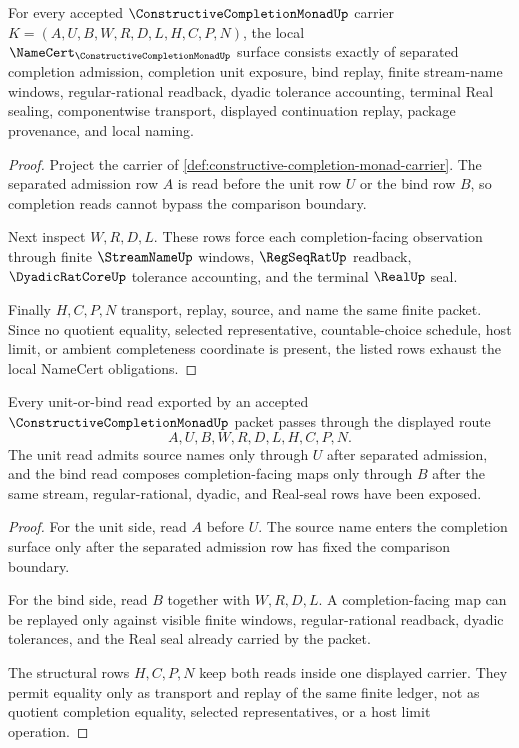 \begin{theorem}
\label{thm:constructive-completion-monad-namecert-obligations}
For every accepted $\ConstructiveCompletionMonadUp$ carrier $K=(A,U,B,W,R,D,L,H,C,P,N)$, the local $\NameCert_{\ConstructiveCompletionMonadUp}$ surface consists exactly of separated completion admission, completion unit exposure, bind replay, finite stream-name windows, regular-rational readback, dyadic tolerance accounting, terminal Real sealing, componentwise transport, displayed continuation replay, package provenance, and local naming.
\end{theorem}
\begin{proof}
Project the carrier of \autoref{def:constructive-completion-monad-carrier}. The separated admission row $A$ is read before the unit row $U$ or the bind row $B$, so completion reads cannot bypass the comparison boundary.

Next inspect $W,R,D,L$. These rows force each completion-facing observation through finite $\StreamNameUp$ windows, $\RegSeqRatUp$ readback, $\DyadicRatCoreUp$ tolerance accounting, and the terminal $\RealUp$ seal.

Finally $H,C,P,N$ transport, replay, source, and name the same finite packet. Since no quotient equality, selected representative, countable-choice schedule, host limit, or ambient completeness coordinate is present, the listed rows exhaust the local NameCert obligations.
\end{proof}

\begin{theorem}
\label{thm:constructive-completion-monad-unit-bind-route}
Every unit-or-bind read exported by an accepted $\ConstructiveCompletionMonadUp$ packet passes through the displayed route
$$
A,U,B,W,R,D,L,H,C,P,N.
$$
The unit read admits source names only through $U$ after separated admission, and the bind read composes completion-facing maps only through $B$ after the same stream, regular-rational, dyadic, and Real-seal rows have been exposed.
\end{theorem}
\begin{proof}
For the unit side, read $A$ before $U$. The source name enters the completion surface only after the separated admission row has fixed the comparison boundary.

For the bind side, read $B$ together with $W,R,D,L$. A completion-facing map can be replayed only against visible finite windows, regular-rational readback, dyadic tolerances, and the Real seal already carried by the packet.

The structural rows $H,C,P,N$ keep both reads inside one displayed carrier. They permit equality only as transport and replay of the same finite ledger, not as quotient completion equality, selected representatives, or a host limit operation.
\end{proof}

